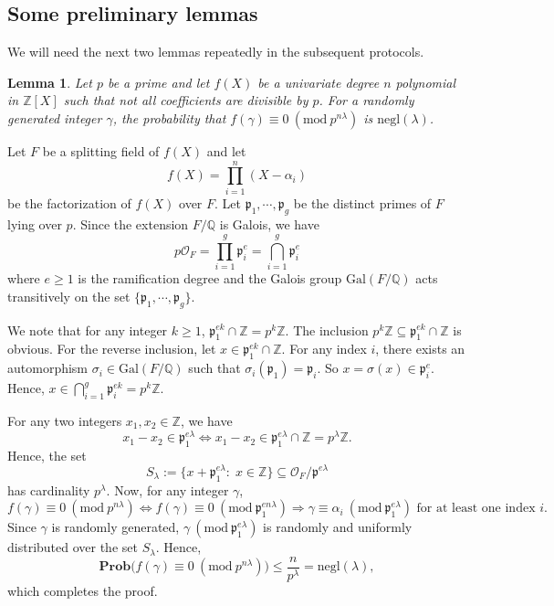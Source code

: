 \documentclass[11pt, lettersize, notitlepage, leqno, footskip=0.6cm]{article}
\newcommand{\bz}{\mathbb Z}
\newcommand{\bq}{\mathbb Q}
\newcommand{\pl}{\prod\limits}
\newcommand{\Gal}{\mathrm{Gal}}
\newcommand{\negl}{\mr{negl}}
\newcommand{\LRA}{\Longleftrightarrow}
\newcommand{\mc}{\mathcal}
\newcommand{\mbf}{\mathbf}
\newcommand{\mr}{\mathrm}
\newcommand{\mfp}{\mathfrak{p}}
\newcommand{\al}{\alpha}
\newcommand{\lam}{\lambda}
\newcommand{\sub}{\subseteq}
\newcommand{\vs}{\vspace{-0.15cm}}
\newcommand{\noin}{\noindent}
\newcommand{\Mod}[1]{\ (\mathrm{mod}\ #1)}
\newtheorem{Lem}[Thm]{Lemma}
\numberwithin{equation}{section}
\begin{document}
\subsection{\fontsize{11}{11}\selectfont Some preliminary lemmas }

\noin We will need the next two lemmas repeatedly in the subsequent protocols.

\begin{Lem} Let $p$ be a prime and let $f(X)$ be a univariate degree $n$ polynomial in $\bz[X]$ such that not all coefficients are divisible by $p$. For a randomly generated integer $\gamma$, the probability that $f(\gamma)\equiv 0\Mod{p^{n\lam}}$ is $\negl(\lam)$.
\end{Lem}

\begin{prf} Let $F$ be a splitting field of $f(X)$ and let \vs $${f}(X) = \pl_{i=1}^n (X-\al_i)$$ be the factorization of ${f}(X)$ over $F$. Let $\mfp_{1},\cdots,\mfp_g$ be the distinct primes of $F$ lying over $p$. Since the extension $F/\bq$ is Galois, we have \vs $$p\mc{O}_F = \pl_{i=1}^{g} \mfp_i^e = \bigcap\limits_{i=1}^{g} \mfp_i^e$$ where $e\geq 1$ is the ramification degree and the Galois group $\Gal(F/\bq)$ acts transitively on the set $\{ \mfp_1,\cdots,\mfp_g\}$.

We note that for any integer $k\geq 1$, $\mfp_1^{ek}\cap \bz = p^{k}\bz$. The inclusion $p^{k}\bz\sub \mfp_1^{ek}\cap \bz$ is obvious. For the reverse inclusion, let $x\in \mfp_1^{ek}\cap \bz$. For any index $i$, there exists an automorphism $\sigma_i\in \Gal(F/\bq)$ such that $\sigma_i(\mfp_1) = \mfp_i$. So $x = \sigma(x) \in \mfp_i^e$. Hence, $x\in \bigcap\limits_{i=1}^g \mfp_i^{ek} = p^{k}\bz$.

For any two integers $x_1,x_2\in \bz$, we have \vs $$x_1-x_2\in \mfp_1^{e\lam}\LRA x_1-x_2\in \mfp_1^{e\lam}\cap \bz = p^{\lam}\bz.$$ Hence, the set \vs $$ S_{\lam}:= \{x + {\mfp_1^{e\lam}}:\;x\in\bz \}\sub \mc{O}_F/\mfp^{e\lam} $$ has cardinality $p^{\lam}$. Now, for any integer $\gamma$, \vs $$f(\gamma)\equiv 0 \Mod{p^{n\lam}} \LRA f(\gamma)\equiv 0 \Mod{\mfp_1^{en\lam}}  \Longrightarrow \gamma\equiv \al_i \Mod{\mfp_1^{e\lam}}\text{ for at least one index } i. $$  Since $\gamma$ is randomly generated, $\gamma\Mod{\mfp_1^{e\lam}}$ is randomly and uniformly distributed over the set $S_{\lam}$. Hence, \vs $$ \mbf{Prob}\big( f(\gamma)\equiv 0 \Mod{p^{n\lam}} \big)\leq \frac{n}{p^{\lam}} = \negl(\lam),$$ which completes the proof.\end{prf}
\end{document}
